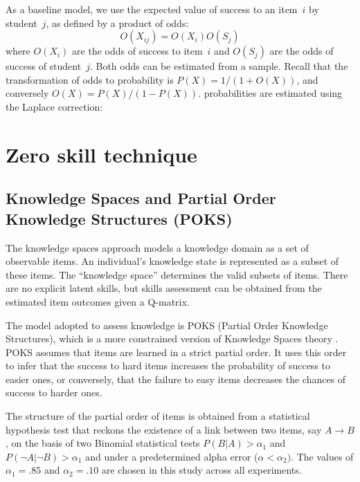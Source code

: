 As a baseline model, we use the expected value of success to an item~$i$ by student~$j$, as defined by a product of odds:
\[ O(X_{ij}) =  O(X_i) O(S_j) \]
where $O(X_i)$ are the odds of success to item~$i$ and $O(S_j)$ are the odds of success of student~$j$.  Both odds can be estimated from a sample.  Recall that the transformation of odds to probability is $P(X) = 1/(1+O(X))$, and conversely $O(X) = P(X)/(1 - P(X))$. probabilities are estimated \DIFaddbegin {}\DIFaddend using the Laplace correction: \DIFdelbegin {}\DIFdelend \DIFaddbegin {}\DIFaddend 


\section{Zero skill technique}
\DIFdelbegin %

\DIFdelend 

\subsection{Knowledge Spaces and Partial Order Knowledge Structures (POKS)}

The {knowledge spaces} approach models a knowledge domain as a set of observable items. An individual's knowledge state is represented as a subset of these items.  The ``knowledge space'' determines the valid subsets of items. There are no explicit latent skills, but skills assessment can be obtained from the estimated item outcomes given a Q-matrix.

The model adopted to assess knowledge is POKS (Partial Order Knowledge Structures), which is a more constrained version of Knowledge Spaces theory \cite{desmarais:umuai:1995}.  POKS assumes that items are learned in a strict partial order.  It uses this order to infer that the success to hard items increases the probability of success to easier ones, or conversely, that the failure to easy items decreases the chances of success to harder ones.

The structure of the partial order of items is obtained from a statistical hypothesis test that reckons the existence of a link between two items, say $A \rightarrow B$, on the basis of two Binomial statistical tests $P(B|A) > \alpha_1$ and $P(\neg A|\neg B) > \alpha_1$ and under a predetermined alpha error ($\alpha < \alpha_2)$.  The values of $\alpha_1 = .85$ and $\alpha_2 = .10$ are chosen in this study across all experiments.

